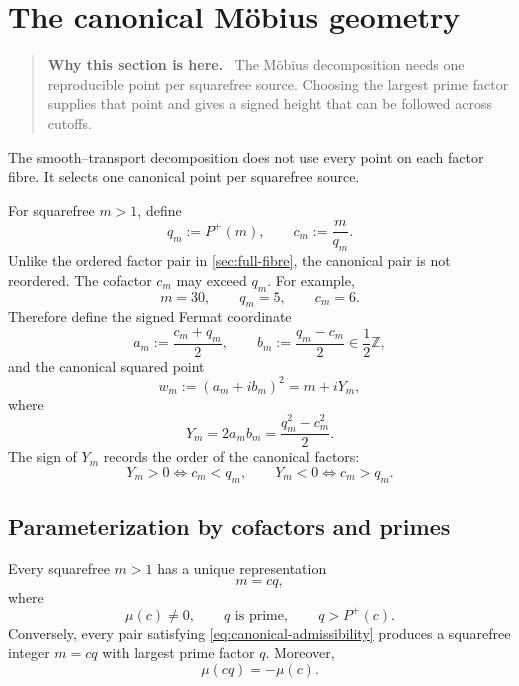 \documentclass[11pt]{article}
\theoremstyle{definition}
\theoremstyle{remark}
\newcommand{\Pplus}{P^{+}}
\newcommand{\1}{\mathbf{1}}
\newcommand{\Z}{\mathbb{Z}}
\newenvironment{motivation}
  {\begin{quote}\small\color{ovvogray}\textbf{Why this section is here.}\ }
  {\end{quote}}
\begin{document}
\section{The canonical M\"obius geometry}
\label{sec:canonical-cloud}

\begin{motivation}
The M\"obius decomposition needs one reproducible point per squarefree source.  Choosing the largest prime factor supplies that point and gives a signed height that can be followed across cutoffs.
\end{motivation}

The smooth--transport decomposition does not use every point on each factor fibre.  It selects one canonical point per squarefree source.

For squarefree $m>1$, define
\begin{equation}
 q_m:=\Pplus(m),
 \qquad
 c_m:=\frac{m}{q_m}.
 \label{eq:canonical-cq}
\end{equation}
Unlike the ordered factor pair in \cref{sec:full-fibre}, the canonical pair is not reordered.  The cofactor $c_m$ may exceed $q_m$.  For example,
\[
 m=30,
 \qquad
 q_m=5,
 \qquad
 c_m=6.
\]
Therefore define the signed Fermat coordinate
\begin{equation}
 a_m:=\frac{c_m+q_m}{2},
 \qquad
 b_m:=\frac{q_m-c_m}{2}\in\frac12\Z,
 \label{eq:signed-Fermat}
\end{equation}
and the canonical squared point
\begin{equation}
 w_m:=(a_m+ib_m)^2
 =m+iY_m,
 \label{eq:canonical-w}
\end{equation}
where
\begin{equation}
 \boxed{Y_m=2a_mb_m=\frac{q_m^2-c_m^2}{2}.}
 \label{eq:signed-Y}
\end{equation}
The sign of $Y_m$ records the order of the canonical factors:
\begin{equation}
 Y_m>0\iff c_m<q_m,
 \qquad
 Y_m<0\iff c_m>q_m.
 \label{eq:Y-sign}
\end{equation}

\subsection{Parameterization by cofactors and primes}

Every squarefree $m>1$ has a unique representation
\begin{equation}
 m=cq,
 \label{eq:cq-general}
\end{equation}
where
\begin{equation}
 \mu(c)\ne0,
 \qquad
 q\text{ is prime},
 \qquad
 q>\Pplus(c).
 \label{eq:canonical-admissibility}
\end{equation}
Conversely, every pair satisfying \cref{eq:canonical-admissibility} produces a squarefree integer $m=cq$ with largest prime factor $q$.  Moreover,
\begin{equation}
 \mu(cq)=-\mu(c).
 \label{eq:canonical-sign}
\end{equation}
\end{document}
